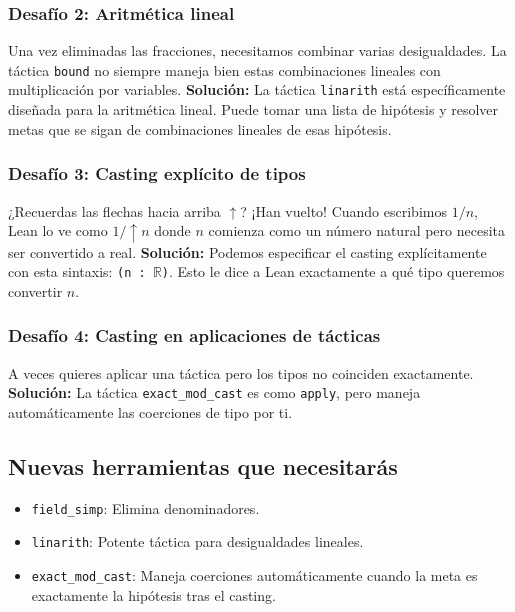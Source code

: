 \subsubsection{Desafío 2: Aritmética lineal}
Una vez eliminadas las fracciones, necesitamos combinar varias desigualdades. La táctica \texttt{bound} no siempre maneja bien estas combinaciones lineales con multiplicación por variables.
\textbf{Solución:} La táctica \texttt{linarith} está específicamente diseñada para la aritmética lineal. Puede tomar una lista de hipótesis y resolver metas que se sigan de combinaciones lineales de esas hipótesis.

\subsubsection{Desafío 3: Casting explícito de tipos}
¿Recuerdas las flechas hacia arriba $\uparrow$? ¡Han vuelto! Cuando escribimos $1/n$, Lean lo ve como $1/\uparrow n$ donde $n$ comienza como un número natural pero necesita ser convertido a real.
\textbf{Solución:} Podemos especificar el casting explícitamente con esta sintaxis: \texttt{(n : $\mathbb{R}$)}. Esto le dice a Lean exactamente a qué tipo queremos convertir $n$.

\subsubsection{Desafío 4: Casting en aplicaciones de tácticas}
A veces quieres aplicar una táctica pero los tipos no coinciden exactamente.
\textbf{Solución:} La táctica \texttt{exact\_mod\_cast} es como \texttt{apply}, pero maneja automáticamente las coerciones de tipo por ti.

\subsection{Nuevas herramientas que necesitarás}
\begin{itemize}
    \item \texttt{field\_simp}: Elimina denominadores.
    \item \texttt{linarith}: Potente táctica para desigualdades lineales.
    \item \texttt{exact\_mod\_cast}: Maneja coerciones automáticamente cuando la meta es exactamente la hipótesis tras el casting.
\end{itemize}

